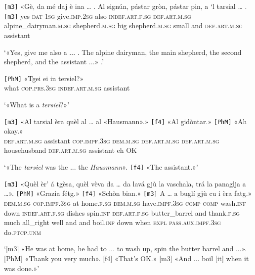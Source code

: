 \begin{linenumbers}
	\gll \texttt{[m3]} «Gè, da mé daj è ina … . Al signún, pástar gròn, pástar pin, a `l tarsial … . \\ \texttt{[m3]} yes \textsc{dat} \textsc{1sg} give.\textsc{imp.2sg} also \textsc{indef.art.f.sg} {} {} \textsc{def.art.m.sg} alpine\_dairyman.\textsc{m.sg} shepherd.\textsc{m.sg} big shepherd.\textsc{m.sg} small and \textsc{def.art.m.sg} assistant\\
\end{linenumbers}
\medskip
\glt `«Yes, give me also a ... . The alpine dairyman, the main shepherd, the second shepherd, and the assistant ...» .'
\medskip

\begin{linenumbers}
	\gll \texttt{[PhM]} «Tgei ei in tersiel?»\\
{} what \textsc{cop.prs.3sg} \textsc{indef.art.m.sg} assistant	\\
\end{linenumbers}
\medskip
\glt `«What is a \textit{tersiel}?»'
\medskip

\begin{linenumbers}
\gll \texttt{[m3]} «Al tarsial èra quèl al … al «Hausmann».»\footnotemark{} \texttt{[f4]} «Al gidòntar.» \texttt{[PhM]} «Ah okay.»\\
{}	\textsc{def.art.m.sg} assistant \textsc{cop.impf.3sg} \textsc{dem.m.sg} \textsc{def.art.m.sg} {} \textsc{def.art.m.sg} househusband {} \textsc{def.art.m.sg} assistant {} eh OK\\
\end{linenumbers}
\medskip
\glt `«The \textit{tarsiel} was the ... the \textit{Hausmann}». \texttt{[f4]} «The assistant.»'
\medskip

\begin{linenumbers}
	\gll  \texttt{[m3]} «Quèl èr’ á tgèsa, quèl vèva da … da lavá gjù la vaschala, trá la panaglja a …». \texttt{[PhM]} «Grazia fétg.» \texttt{[f4]} «Schòn bian.» \texttt{[m3]} A … a buglí gjù cu i èra fatg.»\\
{}	\textsc{dem.m.sg} \textsc{cop.impf.3sg} at home.\textsc{f.sg} \textsc{dem.m.sg} have.\textsc{impf.3sg} \textsc{comp} {} \textsc{comp} wash.\textsc{inf} down \textsc{indef.art.f.sg} dishes spin.\textsc{inf} \textsc{def.art.f.sg} butter\_barrel and {} {} thank.\textsc{f.sg} much {} all\_right well {} and {}  and boil.\textsc{inf} down when \textsc{expl} \textsc{pass.aux.impf.3sg} do.\textsc{ptcp.unm}\\
\end{linenumbers}
\medskip
\glt `[m3] «He was at home, he had to ... to wash up, spin the butter barrel and ...». [PhM] «Thank you very much». [f4] «That's OK.» [m3] «And ...  boil [it] when it was done.»'
\medskip

